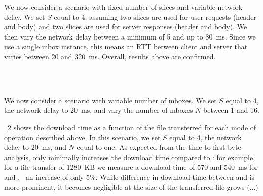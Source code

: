 \documentclass{article}
\begin{document}
We now consider a scenario with fixed number of slices and variable
network delay. We set $S$ equal to 4, assuming two slices are used for
user requests (header and body) and two slices are used for server
responses (header and body). We then vary the network delay between a
minimum of 5 and up to 80~ms. Since we use a single mbox instance,
this means an RTT between client and server that varies between 20 and
320~ms. Overall, results above are confirmed.


\\
\\

\newpage
\begin{figure}[!htbp]
\centering
{}
\label{fig:eval_3}
\end{figure}

We now consider a scenario with variable number of mboxes. We set $S$
equal to 4, the network delay to 20~ms, and vary the number of mboxes
$N$ between 1 and 16. 


\newpage
\begin{figure}[t]
\centering
{}
\label{fig:eval_4}
\end{figure}

\fig~\ref{fig:eval_4} shows the download time as a function of the
file transferred for each mode of operation described above. In this
scenario, we set $S$ equal to 4, the network delay to 20~ms, and $N$
equal to one.  As expected from the time to first byte analysis,
\sppmode only minimally increases the download time compared to
\etemode: for example, for a file transfer of 1280~KB we measure a
download time of 570 and 540~ms for \sppmode and \etemode, \ie~an
increase of only 5\%. While difference in download time between
\sppmode and \splitmode is more prominent, it becomes negligible at
the size of the transferred file grows (...) \\

\\

\\
\end{document}
